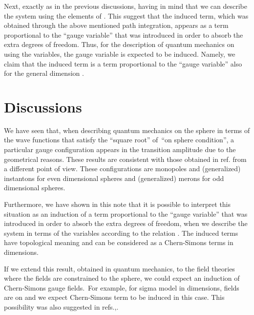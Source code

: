 \documentclass[12pt,a4paper]{article}
\begin{document}
Next, exactly as in the previous discussions, having in mind that \coordHE{} we can describe the system using the elements of \coordHE{}. This suggest that the induced term, which was obtained through the
above mentioned path integration, appears as a term proportional to the
``gauge variable'' \coordHE{} that was introduced in order to
absorb the extra degrees of freedom. Thus, for the description of quantum
mechanics on \coordHE{} using the \coordHE{} variables, the gauge variable \coordHE{} is expected to be induced. Namely, we claim that the
induced term is a term proportional to the ``gauge variable'' also for the
general dimension \coordHE{}.

\section{Discussions}

We have seen that, when describing quantum mechanics on the sphere in terms
of the wave functions that satisfy the ``square root'' of\ ``on sphere
condition'', a particular gauge configuration appears in the transition
amplitude due to the geometrical reasons. These results are consistent with
those obtained in ref.\cite{Tanimura:1996cg} from a different point of view.
These configurations are monopoles and (generalized) instantons for even
dimensional spheres and (generalized) merons for odd dimensional spheres.

Furthermore, we have shown in this note that it is possible to interpret
this situation as an induction of a term proportional to the ``gauge
variable'' that was introduced in order to absorb the extra degrees of
freedom, when we describe the \coordHE{} system in terms of the \coordHE{}
variables according to the relation \coordHE{}. The induced terms
have topological meaning and can be considered as a Chern-Simons terms in \coordHE{} dimensions.

If we extend this result, obtained in quantum mechanics, to the field
theories where the fields are constrained to the sphere, we could expect an
induction of Chern-Simons gauge fields.\ For example, for \coordHE{} sigma model
in \coordHE{} dimensions, fields are on \coordHE{} and we expect \coordHE{}
Chern-Simons term to be induced in this case. This possibility was also
suggested in refs.\cite{Igarashi:1997tk},\cite{Kobayashi:1997rf}.
\end{document}
